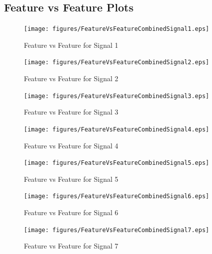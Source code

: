 \documentclass[]{article}
\begin{document}
\begin{appendices}




{\clearpage}

\section{Feature vs Feature Plots}
\label{appendix:Plots}
\setcounter{page}{1}
\begin{figure}[H]
    \centering
    \texttt{[image: figures/FeatureVsFeatureCombinedSignal1.eps]}
    \caption{Feature vs Feature for Signal 1}
\end{figure}

\begin{figure}[H]
    \centering
    \texttt{[image: figures/FeatureVsFeatureCombinedSignal2.eps]}
    \caption{Feature vs Feature for Signal 2}
\end{figure}

\begin{figure}[H]
    \centering
    \texttt{[image: figures/FeatureVsFeatureCombinedSignal3.eps]}
    \caption{Feature vs Feature for Signal 3}
\end{figure}

\begin{figure}[H]
    \centering
    \texttt{[image: figures/FeatureVsFeatureCombinedSignal4.eps]}
    \caption{Feature vs Feature for Signal 4}
\end{figure}

\begin{figure}[H]
    \centering
    \texttt{[image: figures/FeatureVsFeatureCombinedSignal5.eps]}
    \caption{Feature vs Feature for Signal 5}
\end{figure}

\begin{figure}[H]
    \centering
    \texttt{[image: figures/FeatureVsFeatureCombinedSignal6.eps]}
    \caption{Feature vs Feature for Signal 6}
\end{figure}

\begin{figure}[H]
    \centering
    \texttt{[image: figures/FeatureVsFeatureCombinedSignal7.eps]}
    \caption{Feature vs Feature for Signal 7}
\end{figure}


\end{appendices}
\end{document}
